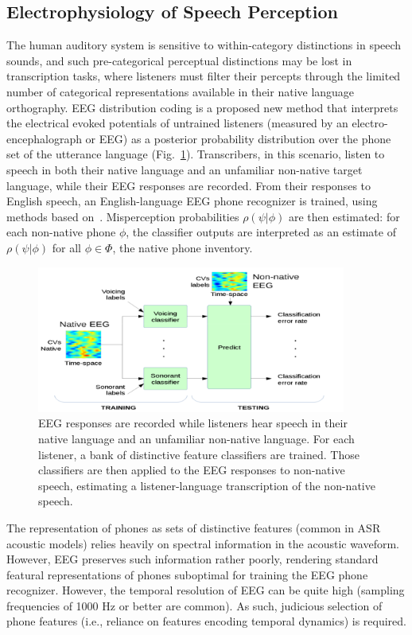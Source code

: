 \subsection{Electrophysiology of Speech Perception}

The human auditory system is sensitive to within-category distinctions 
in speech sounds, and such pre-categorical perceptual distinctions may 
be lost in transcription tasks, where listeners must filter their 
percepts through the limited number of categorical representations 
available in their native language orthography. 
EEG distribution coding is a proposed new method that interprets the
electrical evoked potentials of untrained listeners
(measured by an electro-encephalograph or EEG) as a posterior
probability distribution over the phone set of the utterance language
(Fig.~\ref{fig:eeg_paradigm}).  Transcribers, in this scenario, listen
to speech in both their native language and an unfamiliar non-native
target language, while their EEG responses are
recorded.  From their responses to English speech, an English-language
EEG phone recognizer is trained, using methods based
on~\cite{Liberto15}.  Misperception probabilities $\rho(\psi|\phi)$
are then estimated: for each non-native phone $\phi$, the
classifier outputs are interpreted as an estimate of $\rho(\psi|\phi)$
for all $\phi\in\mathbb{\Phi}$, the native phone inventory.

\begin{figure}
  \centerline{\includegraphics[width=4in]{../figs/diliberto_paradigm.png}}
  \caption{EEG responses are recorded while listeners hear speech in
    their native language and an unfamiliar non-native language.  For 
    each listener, a bank of distinctive feature classifiers are trained. 
    Those classifiers are then applied to the EEG responses to non-native
    speech, estimating a listener-language transcription of the
    non-native speech.}
  \label{fig:eeg_paradigm}
\end{figure}

The representation of phones as sets of distinctive features (common in
ASR acoustic models) relies heavily on spectral information in the
acoustic waveform. However, EEG preserves such information rather poorly,
rendering standard featural representations of phones suboptimal for
training the EEG phone recognizer. However, the temporal resolution of
EEG can be quite high (sampling frequencies of 1000 Hz or better are
common). As such, judicious selection of phone features (i.e., reliance
on features encoding temporal dynamics) is required.
